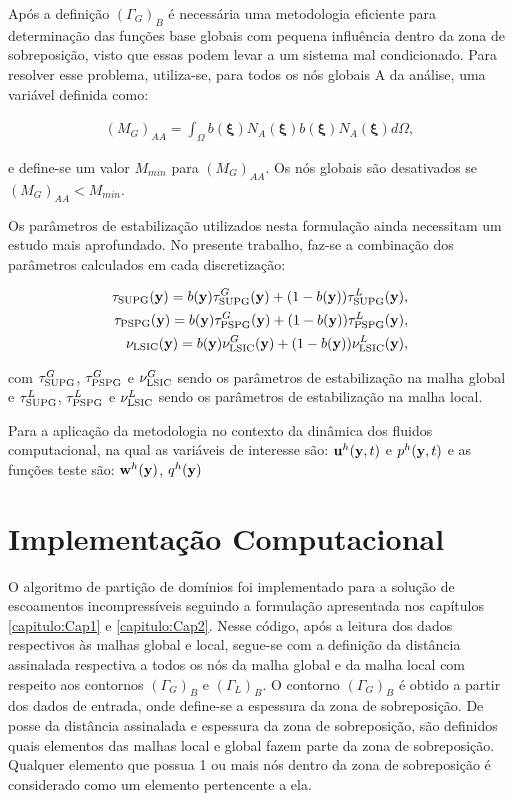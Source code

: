 \documentclass[tese_patricia]{subfiles}
\begin{document}
Após a definição $(\Gamma_{G})_{B}$ é necessária uma metodologia eficiente para determinação das funções base globais com pequena influência dentro da zona de sobreposição, visto que essas podem levar a um sistema mal condicionado. Para resolver esse problema, utiliza-se, para todos os n\'os globais A da análise, uma variável definida como:

\begin{align}
(M_{G})_{AA} = \int_{\Omega}b(\bm{\xi})N_{A}(\bm{\xi})b(\bm{\xi})N_{A}(\bm{\xi})d\Omega, \label{eq:influence}
\end{align}

\noindent e define-se um valor $M_{min}$ para $(M_{G})_{AA}$. Os n\'os globais s\~ao desativados se $(M_{G})_{AA} < M_{min}$.

Os parâmetros de estabilização utilizados nesta formulação ainda necessitam um estudo mais aprofundado. No presente trabalho, faz-se a combinação dos parâmetros calculados em cada discretização:

\begin{align}
\tau_{\mathrm{SUPG}}(\mathbf{y}) =  b(\mathbf{y})\tau_{\mathrm{SUPG}}^{G}(\mathbf{y}) + (1-b(\mathbf{y}))\tau_{\mathrm{SUPG}}^{L}(\mathbf{y}),\\
\tau_{\mathrm{PSPG}}(\mathbf{y}) =  b(\mathbf{y})\tau_{\mathrm{PSPG}}^{G}(\mathbf{y}) + (1-b(\mathbf{y}))\tau_{\mathrm{PSPG}}^{L}(\mathbf{y}),\\
\nu_{\mathrm{LSIC}}(\mathbf{y}) =  b(\mathbf{y})\nu_{\mathrm{LSIC}}^{G}(\mathbf{y}) + (1-b(\mathbf{y}))\nu_{\mathrm{LSIC}}^{L}(\mathbf{y}),
\end{align}

\noindent com $\tau_{\mathrm{SUPG}}^{G}$, $\tau_{\mathrm{PSPG}}^{G}$ e $\nu_{\mathrm{LSIC}}^{G}$ sendo os parâmetros de estabilização na malha global e $\tau_{\mathrm{SUPG}}^{L}$, $\tau_{\mathrm{PSPG}}^{L}$ e  $\nu_{\mathrm{LSIC}}^{L}$ sendo os parâmetros de estabilização na malha local.



Para a aplicação da metodologia no contexto da dinâmica dos fluidos computacional, na qual as variáveis de interesse são: $\mathbf{u}^h(\mathbf{y},t)$ e $p^h(\mathbf{y},t)$ e as funções teste são: $\mathbf{w}^h(\mathbf{y})$, $q^h(\mathbf{y})$ 



\section{Implementação Computacional}

O algoritmo de partição de domínios foi implementado para a solução de escoamentos incompressíveis seguindo a formulação apresentada nos capítulos \ref{capitulo:Cap1} e \ref{capitulo:Cap2}. Nesse código, após a leitura dos dados respectivos às malhas global e local, segue-se com a definição da distância assinalada respectiva a todos os nós da malha global e da malha local com respeito aos contornos $(\Gamma_{G})_{B}$ e $(\Gamma_{L})_{B}$. O contorno  $(\Gamma_{G})_{B}$ é obtido a partir dos dados de entrada, onde define-se a espessura da zona de sobreposição. De posse da distância assinalada e espessura da zona de sobreposição, são definidos quais elementos das malhas local e global fazem parte da zona de sobreposição. Qualquer elemento que possua 1 ou mais nós dentro da zona de sobreposição é considerado como um elemento pertencente a ela.
\end{document}
